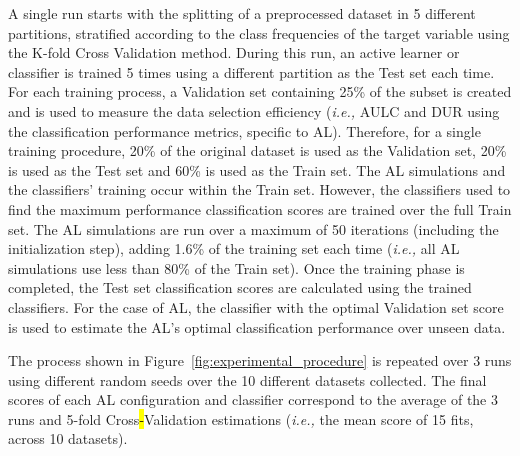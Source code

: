 \documentclass[preprint, 12pt]{elsarticle}
\begin{document}
A single run starts with the splitting of a preprocessed dataset in 5
different partitions, stratified according to the class frequencies of the
target variable using the K-fold Cross Validation method. During this run, an
active learner or classifier is trained 5 times using a different partition as
the Test set each time. For each training process, a Validation set containing
25\% of the subset is created and is used to measure the data selection
efficiency (\textit{i.e.,} AULC and DUR using the classification performance
metrics, specific to AL). Therefore, for a single training procedure, 20\% of
the original dataset is used as the Validation set, 20\% is used as the Test
set and 60\% is used as the Train set. The AL simulations and the classifiers'
training occur within the Train set. However, the classifiers used to find the
maximum performance classification scores are trained over the full Train set.
The AL simulations are run over a maximum of 50 iterations (including the
initialization step), adding 1.6\% of the training set each time
(\textit{i.e.,} all AL simulations use less than 80\% of the Train set). Once
the training phase is completed, the Test set classification scores are
calculated using the trained classifiers. For the case of AL, the classifier
with the optimal Validation set score is used to estimate the AL's optimal
classification performance over unseen data.

The process shown in Figure~\ref{fig:experimental_procedure} is repeated over
3 runs using different random seeds over the 10 different datasets collected.
The final scores of each AL configuration and classifier correspond to the
average of the 3 runs and 5-fold Cross\hl{-}Validation estimations
(\textit{i.e.,} the mean score of 15 fits, across 10 datasets).
\end{document}
